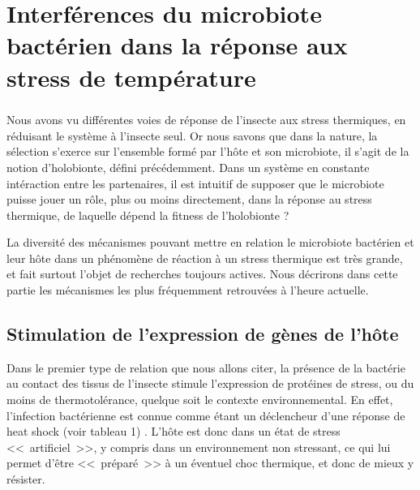 \chapter{Interférences du microbiote bactérien dans la réponse aux stress de température} %

\paragraph*{}
Nous avons vu différentes voies de réponse de l'insecte aux stress thermiques, en réduisant le système à l'insecte seul.
Or nous savons que dans la nature, la sélection s'exerce sur l'ensemble formé par l'hôte et son microbiote, il s'agit de la notion d'holobionte, défini précédemment.
Dans un système en constante intéraction entre les partenaires, il est intuitif de supposer que le microbiote puisse jouer un rôle, plus ou moins directement, dans la réponse au stress thermique, de laquelle dépend la fitness de l'holobionte ?

La diversité des mécanismes pouvant mettre en relation le microbiote bactérien et leur hôte dans un phénomène de réaction à un stress thermique est très grande, et fait surtout l'objet de recherches toujours actives.
Nous décrirons dans cette partie les mécanismes les plus fréquemment retrouvées à l'heure actuelle.

\section{Stimulation de l'expression de gènes de l'hôte}

Dans le premier type de relation que nous allons citer, la présence de la bactérie au contact des tissus de l'insecte stimule l'expression de protéines de stress, ou du moins de thermotolérance, quelque soit le contexte environnemental.
En effet, l'infection bactérienne est connue comme étant un déclencheur d'une réponse de heat shock (voir tableau 1) \cite{deitch1995}.
L'hôte est donc dans un état de stress <<~artificiel~>>, y compris dans un environnement non stressant, ce qui lui permet d'être <<~préparé~>> à un éventuel choc thermique, et donc de mieux y résister.

